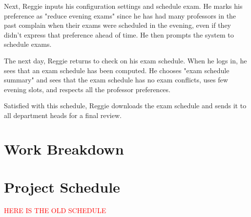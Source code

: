 \documentclass[11pt]{article}
\begin{document}
\begin{description}
Next, Reggie inputs his configuration settings and schedule exam.
He marks his preference as "reduce evening exams" since he has had many professors
in the past complain when their exams were scheduled in the evening,
even if they didn't express that preference ahead of time.
He then prompts the system to schedule exams.

The next day, Reggie returns to check on his exam schedule.
When he logs in, he sees that an exam schedule has been computed.
He chooses "exam schedule summary" and sees that
the exam schedule has no exam conflicts, uses few evening slots,
and respects all the professor preferences.

Satisfied with this schedule, Reggie downloads the exam schedule
 and sends it to all department heads for a final review.


\end{description}


\section{Work Breakdown}




\section{Project Schedule}


\textcolor{red}{HERE IS THE OLD SCHEDULE}
\end{document}
